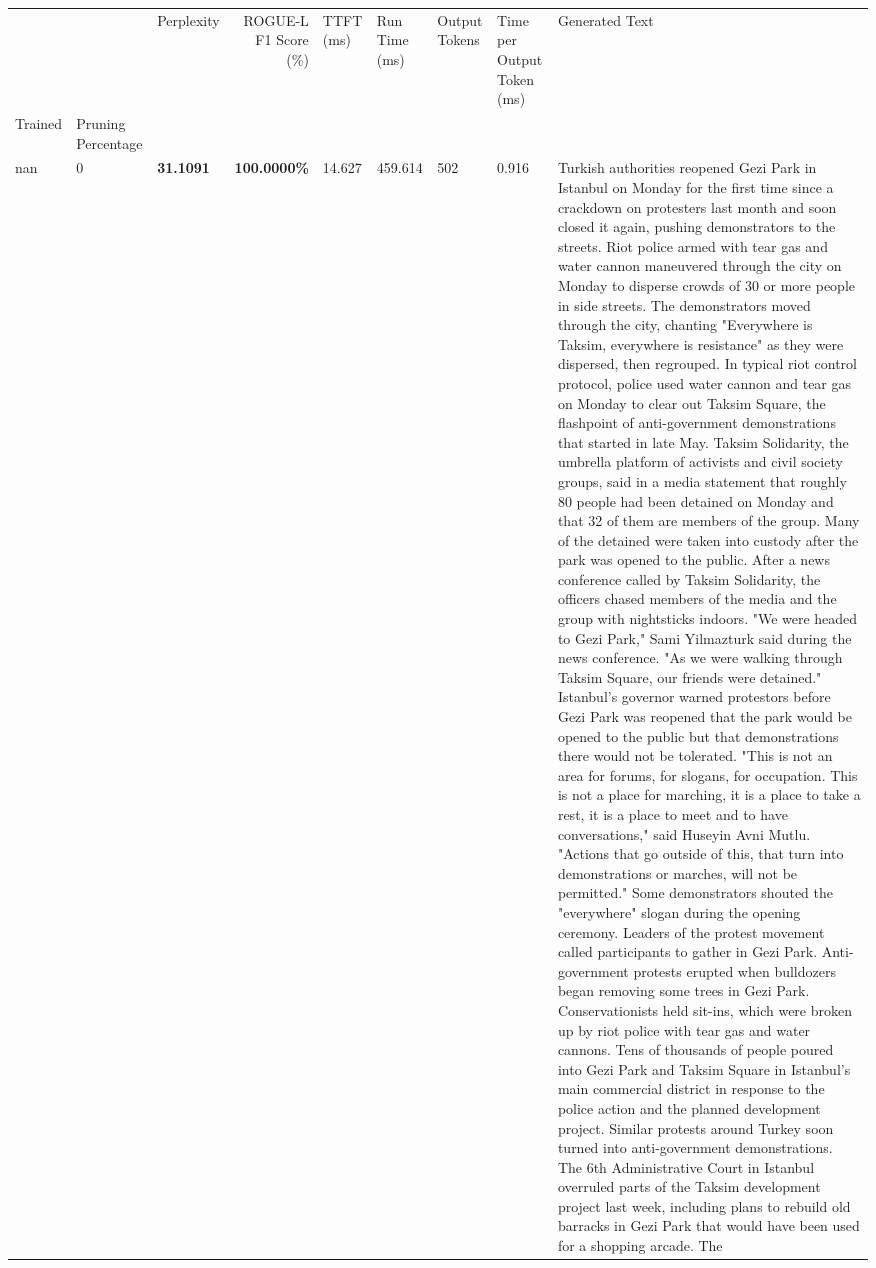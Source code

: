 \begin{table}[H]
\label{tab:evaluation-pipeline-11}
\begin{tabular}{lllrlllll}
\toprule
 &  & Perplexity & ROGUE-L F1 Score (\%) & TTFT (ms) & Run Time (ms) & Output Tokens & Time per Output Token (ms) & Generated Text \\
Trained & Pruning Percentage &  &  &  &  &  &  &  \\
\midrule
nan & 0 & \bfseries 31.1091 & \bfseries 100.0000\% & 14.627 & 459.614 & 502 & 0.916 & Turkish authorities reopened Gezi Park in Istanbul on Monday for the first time since a crackdown on protesters last month and soon closed it again, pushing demonstrators to the streets. Riot police armed with tear gas and water cannon maneuvered through the city on Monday to disperse crowds of 30 or more people in side streets. The demonstrators moved through the city, chanting "Everywhere is Taksim, everywhere is resistance" as they were dispersed, then regrouped. In typical riot control protocol, police used water cannon and tear gas on Monday to clear out Taksim Square, the flashpoint of anti-government demonstrations that started in late May. Taksim Solidarity, the umbrella platform of activists and civil society groups, said in a media statement that roughly 80 people had been detained on Monday and that 32 of them are members of the group. Many of the detained were taken into custody after the park was opened to the public. After a news conference called by Taksim Solidarity, the officers chased members of the media and the group with nightsticks indoors. "We were headed to Gezi Park," Sami Yilmazturk said during the news conference. "As we were walking through Taksim Square, our friends were detained." Istanbul's governor warned protestors before Gezi Park was reopened that the park would be opened to the public but that demonstrations there would not be tolerated. "This is not an area for forums, for slogans, for occupation. This is not a place for marching, it is a place to take a rest, it is a place to meet and to have conversations," said Huseyin Avni Mutlu. "Actions that go outside of this, that turn into demonstrations or marches, will not be permitted." Some demonstrators shouted the "everywhere" slogan during the opening ceremony. Leaders of the protest movement called participants to gather in Gezi Park. Anti-government protests erupted when bulldozers began removing some trees in Gezi Park. Conservationists held sit-ins, which were broken up by riot police with tear gas and water cannons. Tens of thousands of people poured into Gezi Park and Taksim Square in Istanbul's main commercial district in response to the police action and the planned development project. Similar protests around Turkey soon turned into anti-government demonstrations. The 6th Administrative Court in Istanbul overruled parts of the Taksim development project last week, including plans to rebuild old barracks in Gezi Park that would have been used for a shopping arcade. The \\

\end{tabular}
\end{table}
